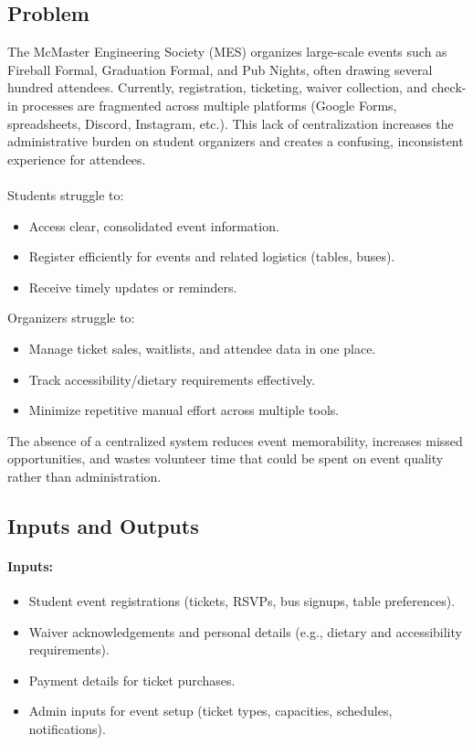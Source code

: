 \documentclass{article}
\begin{document}
\subsection{Problem}
The McMaster Engineering Society (MES) organizes large-scale events such as Fireball Formal, Graduation Formal,
 and Pub Nights, often drawing several hundred attendees. Currently, registration, ticketing, waiver collection,
 and check-in processes are fragmented across multiple platforms (Google Forms, spreadsheets, Discord, Instagram,
 etc.). This lack of centralization increases the administrative burden on student organizers and creates a
 confusing, inconsistent experience for attendees.
\\
\\Students struggle to:
\begin{itemize}
    \item Access clear, consolidated event information.
    \item Register efficiently for events and related logistics (tables, buses).
    \item Receive timely updates or reminders.
\end{itemize}
Organizers struggle to:
\begin{itemize}
    \item Manage ticket sales, waitlists, and attendee data in one place.
    \item Track accessibility/dietary requirements effectively.
    \item Minimize repetitive manual effort across multiple tools.
\end{itemize}
The absence of a centralized system reduces event memorability, increases missed opportunities, and 
wastes volunteer time that could be spent on event quality rather than administration.

\subsection{Inputs and Outputs}

\paragraph{Inputs:}
\begin{itemize}
    \item Student event registrations (tickets, RSVPs, bus signups, table preferences).
    \item Waiver acknowledgements and personal details (e.g., dietary and accessibility requirements).
    \item Payment details for ticket purchases.
    \item Admin inputs for event setup (ticket types, capacities, schedules, notifications).
\end{itemize}
\end{document}
